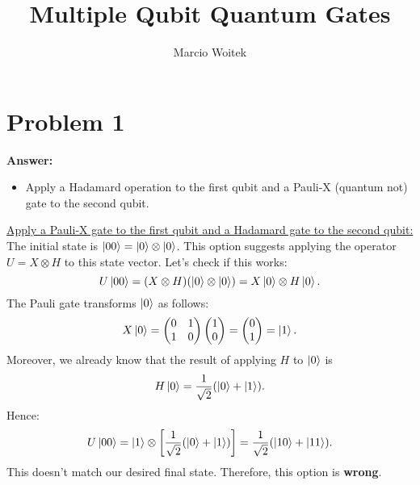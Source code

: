 \documentclass[11pt]{article}
\author{Marcio Woitek}
\date{}
\title{Multiple Qubit Quantum Gates}
\newcommand{\invroot}[1]{\frac{1}{\sqrt{#1}}}
\begin{document}
\maketitle
\thispagestyle{empty}
\pagestyle{empty}
\section*{Problem 1}
\label{sec:org833287d}
\textbf{Answer:}
\begin{itemize}
\item Apply a Hadamard operation to the first qubit and a Pauli-X (quantum not) gate
to the second qubit.\\
\end{itemize}

\uline{Apply a Pauli-X gate to the first qubit and a Hadamard gate to the second qubit:}\\
The initial state is \(\ket{00}=\ket{0}\otimes\ket{0}\). This option suggests
applying the operator \(U=X\otimes H\) to this state vector. Let's check if
this works:
\begin{equation}
U\ket{00}=(X\otimes H)(\ket{0}\otimes\ket{0})=X\ket{0}\otimes H\ket{0}.
\end{equation}
The Pauli gate transforms \(\ket{0}\) as follows:
\begin{equation}
X\ket{0}=
  \begin{pmatrix}
    0 & 1\\
    1 & 0
  \end{pmatrix}
  \begin{pmatrix}
    1\\
    0
  \end{pmatrix}=
  \begin{pmatrix}
    0\\
    1
  \end{pmatrix}=\ket{1}.
\end{equation}
Moreover, we already know that the result of applying \(H\) to \(\ket{0}\) is
\begin{equation}
H\ket{0}=\invroot{2}(\ket{0}+\ket{1}).
\end{equation}
Hence:
\begin{equation}
U\ket{00}=\ket{1}\otimes\left[\invroot{2}(\ket{0}+\ket{1})\right]=\invroot{2}(\ket{10}+\ket{11}).
\end{equation}
This doesn't match our desired final state. Therefore, this option is \textbf{wrong}.\\
\end{document}
